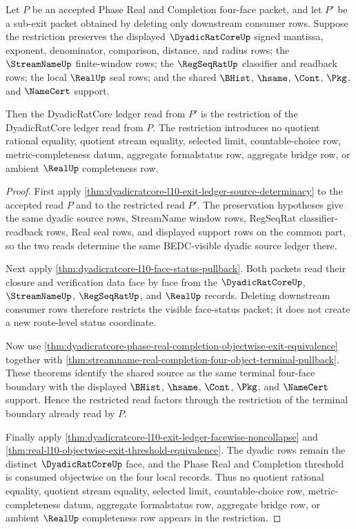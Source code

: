 \begin{theorem}
\label{thm:dyadicratcore-l10-exit-ledger-restriction-functoriality}
Let $P$ be an accepted Phase Real and Completion four-face packet, and let $P'$ be a sub-exit packet obtained by deleting only downstream consumer rows. Suppose the restriction preserves the displayed $\DyadicRatCoreUp$ signed mantissa, exponent, denominator, comparison, distance, and radius rows; the $\StreamNameUp$ finite-window rows; the $\RegSeqRatUp$ classifier and readback rows; the local $\RealUp$ seal rows; and the shared $\BHist$, $\hsame$, $\Cont$, $\Pkg$, and $\NameCert$ support.

Then the DyadicRatCore ledger read from $P'$ is the restriction of the DyadicRatCore ledger read from $P$. The restriction introduces no quotient rational equality, quotient stream equality, selected limit, countable-choice row, metric-completeness datum, aggregate formalstatus row, aggregate bridge row, or ambient $\RealUp$ completeness row.
\end{theorem}
\begin{proof}
First apply \autoref{thm:dyadicratcore-l10-exit-ledger-source-determinacy} to the accepted read $P$ and to the restricted read $P'$. The preservation hypotheses give the same dyadic source rows, StreamName window rows, RegSeqRat classifier-readback rows, Real seal rows, and displayed support rows on the common part, so the two reads determine the same BEDC-visible dyadic source ledger there.

Next apply \autoref{thm:dyadicratcore-l10-face-status-pullback}. Both packets read their closure and verification data face by face from the $\DyadicRatCoreUp$, $\StreamNameUp$, $\RegSeqRatUp$, and $\RealUp$ records. Deleting downstream consumer rows therefore restricts the visible face-status packet; it does not create a new route-level status coordinate.

Now use \autoref{thm:dyadicratcore-phase-real-completion-objectwise-exit-equivalence} together with \autoref{thm:streamname-real-completion-four-object-terminal-pullback}. These theorems identify the shared source as the same terminal four-face boundary with the displayed $\BHist$, $\hsame$, $\Cont$, $\Pkg$, and $\NameCert$ support. Hence the restricted read factors through the restriction of the terminal boundary already read by $P$.

Finally apply \autoref{thm:dyadicratcore-l10-exit-ledger-facewise-noncollapse} and \autoref{thm:real-l10-objectwise-exit-threshold-equivalence}. The dyadic rows remain the distinct $\DyadicRatCoreUp$ face, and the Phase Real and Completion threshold is consumed objectwise on the four local records. Thus no quotient rational equality, quotient stream equality, selected limit, countable-choice row, metric-completeness datum, aggregate formalstatus row, aggregate bridge row, or ambient $\RealUp$ completeness row appears in the restriction.
\end{proof}

